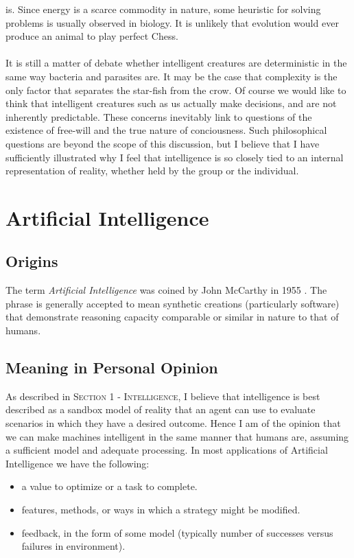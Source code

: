 \documentclass[10pt,a4paper]{article}
\begin{document}
				is. Since energy is a scarce commodity in nature, some heuristic for
				solving problems is usually observed in biology. It is unlikely that
				evolution would ever produce an animal to play perfect Chess. \\\\ It is
				still a matter of debate whether intelligent creatures are deterministic
				in the same way bacteria and parasites are. It may be the case that
				complexity is the only factor that separates the star-fish from the
				crow. Of course we would like to think that intelligent creatures such
				as us actually make decisions, and are not inherently predictable. These
				concerns inevitably link to questions of the existence of free-will and
				the true nature of conciousness. Such philosophical questions are beyond
				the scope of this discussion, but I believe that I have sufficiently
				illustrated why I feel that intelligence is so closely tied to an
				internal representation of reality, whether held by the group or the
				individual.

		\pagebreak \section{Artificial Intelligence} \subsection{Origins} The term
		\textsl{Artificial Intelligence} was coined by John McCarthy in 1955
		\cite{intel}. The phrase is generally accepted to mean synthetic creations
		(particularly software) that demonstrate reasoning capacity comparable or
		similar in nature to that of humans.

			\subsection{Meaning in Personal Opinion}

				As described in \textsc{Section 1 - Intelligence}, I believe that
				intelligence is best described as a sandbox model of reality that an
				agent can use to evaluate scenarios in which they have a desired
				outcome. Hence I am of the opinion that we can make machines intelligent
				in the same manner that humans are, assuming a sufficient model and
				adequate processing. In most applications of Artificial Intelligence we
				have the following:

				\begin{itemize} \item a value to optimize or a task to complete. \item
				features, methods,  or ways in which a strategy might be modified. \item
				feedback, in the form of some model (typically number of successes
				versus failures in environment). \end{itemize}
\end{document}
